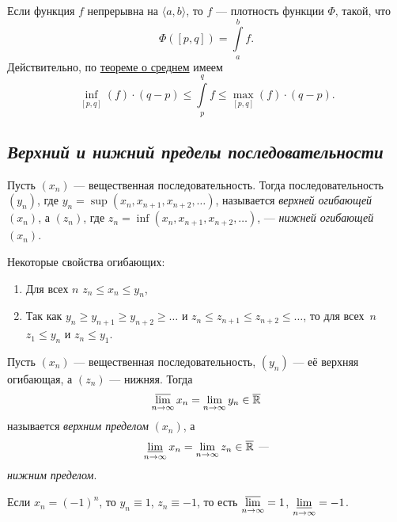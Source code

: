 \begin{example}
	Если функция \(f\) непрерывна на \(\langle a, b \rangle\), то \(f\) --- плотность функции \(\Phi\), такой, что \[
	\Phi([p, q]) = \int\limits_a^b f.
	\]
	Действительно, по \hyperlink{sredneye}{теореме о среднем} имеем\[
	\inf_{[p, q]} (f) \cdot (q - p) \leqslant \int\limits_p^q f \leqslant \max_{[p, q]} (f) \cdot (q - p).
	\]
\end{example}

\subsection{\itshape Верхний и нижний пределы последовательности}

\begin{ndefinition}
	Пусть \((x_n)\) --- вещественная последовательность. Тогда последовательность \((y_n)\), где \(y_n = \sup (x_n, x_{n + 1}, x_{n + 2}, \ldots)\), называется \textit{верхней огибающей} \((x_n)\), а \((z_n)\), где \(z_n = \inf (x_n, x_{n + 1}, x_{n + 2}, \ldots)\), --- \textit{нижней огибающей} \((x_n)\).
\end{ndefinition}

\begin{remark}
	Некоторые свойства огибающих:
	\begin{enumerate}
		\item Для всех \(n\) \(z_n \leqslant x_n \leqslant y_n\),
		\item Так как \(y_n \geqslant y_{n + 1} \geqslant y_{n + 2} \geqslant \ldots\) и \(z_n \leqslant z_{n + 1} \leqslant z_{n + 2} \leqslant \ldots\), то для всех~\(n\) \(z_1 \leqslant y_n\) и \(z_n \leqslant y_1\).
	\end{enumerate}
\end{remark}

\begin{ndefinition}
	Пусть \((x_n)\) --- вещественная последовательность, \((y_n)\) --- её верхняя огибающая, а \((z_n)\) --- нижняя. Тогда \[
	\varlimsup_{n \to \infty} x_n = \lim_{n \to \infty} y_n \in \overline{\mathbb{R}}
	\]
	называется \textit{верхним пределом} \((x_n)\), а \[
	\varliminf\limits_{n \to \infty} x_n = \lim\limits_{n \to \infty} z_n \in \overline{\mathbb{R}} \ \textit{---}
	\]
	\textit{нижним пределом}.
\end{ndefinition}

\begin{example}
	Если \(x_n = (-1)^n\), то \(y_n \equiv 1\), \(z_n \equiv -1\), то есть \(\varlimsup\limits_{n \to \infty} = 1\), \(\varliminf\limits_{n \to \infty} = -1\).
\end{example}


